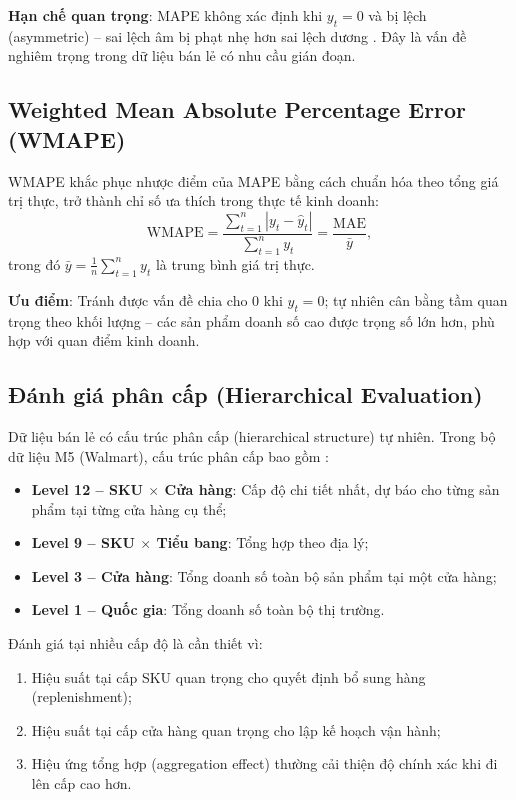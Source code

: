 \textbf{Hạn chế quan trọng}: MAPE không xác định khi $y_t = 0$ và bị lệch (asymmetric) -- sai lệch âm bị phạt nhẹ hơn sai lệch dương \citep{hyndman2006another}. Đây là vấn đề nghiêm trọng trong dữ liệu bán lẻ có nhu cầu gián đoạn.

\subsection{Weighted Mean Absolute Percentage Error (WMAPE)}
\label{subsec:wmape}

WMAPE khắc phục nhược điểm của MAPE bằng cách chuẩn hóa theo tổng giá trị thực, trở thành chỉ số ưa thích trong thực tế kinh doanh:
\begin{equation}
    \text{WMAPE} = \frac{\sum_{t=1}^{n}|y_t - \hat{y}_t|}{\sum_{t=1}^{n}y_t} = \frac{\text{MAE}}{\bar{y}},
    \label{eq:wmape}
\end{equation}
trong đó $\bar{y} = \frac{1}{n}\sum_{t=1}^{n} y_t$ là trung bình giá trị thực.

\textbf{Ưu điểm}: Tránh được vấn đề chia cho 0 khi $y_t = 0$; tự nhiên cân bằng tầm quan trọng theo khối lượng -- các sản phẩm doanh số cao được trọng số lớn hơn, phù hợp với quan điểm kinh doanh.

\subsection{Đánh giá phân cấp (Hierarchical Evaluation)}
\label{subsec:hieu_suat_phan_cap}

Dữ liệu bán lẻ có cấu trúc phân cấp (hierarchical structure) tự nhiên. Trong bộ dữ liệu M5 (Walmart), cấu trúc phân cấp bao gồm \citep{makridakis2022m5}:

\begin{itemize}
    \item \textbf{Level 12 -- SKU $\times$ Cửa hàng}: Cấp độ chi tiết nhất, dự báo cho từng sản phẩm tại từng cửa hàng cụ thể;
    \item \textbf{Level 9 -- SKU $\times$ Tiểu bang}: Tổng hợp theo địa lý;
    \item \textbf{Level 3 -- Cửa hàng}: Tổng doanh số toàn bộ sản phẩm tại một cửa hàng;
    \item \textbf{Level 1 -- Quốc gia}: Tổng doanh số toàn bộ thị trường.
\end{itemize}

Đánh giá tại nhiều cấp độ là cần thiết vì:
\begin{enumerate}
    \item Hiệu suất tại cấp SKU quan trọng cho quyết định bổ sung hàng (replenishment);
    \item Hiệu suất tại cấp cửa hàng quan trọng cho lập kế hoạch vận hành;
    \item Hiệu ứng tổng hợp (aggregation effect) thường cải thiện độ chính xác khi đi lên cấp cao hơn.
\end{enumerate}

